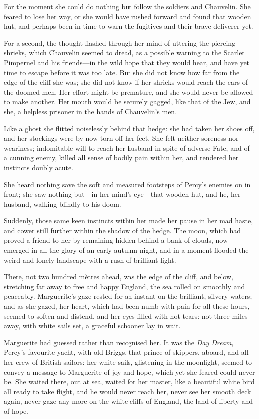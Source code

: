 \documentclass[paper=5.5in:8.5in,BCOR=7mm,twoside,DIV=calc,12pt,usegeometry,chapterprefix,endperiod,headings=big]{scrbook}
\begin{document}
For the moment she could do nothing but follow the soldiers and Chauvelin. She feared to lose her way, or she would have rushed forward and found that wooden hut, and perhaps been in time to warn the fugitives and their brave deliverer yet.

For a second, the thought flashed through her mind of uttering the piercing shrieks, which Chauvelin seemed to dread, as a possible warning to the Scarlet Pimpernel and his friends---in the wild hope that they would hear, and have yet time to escape before it was too late. But she did not know how far from the edge of the cliff she was; she did not know if her shrieks would reach the ears of the doomed men. Her effort might be premature, and she would never be allowed to make another. Her mouth would be securely gagged, like that of the Jew, and she, a helpless prisoner in the hands of Chauvelin's men.

Like a ghost she flitted noiselessly behind that hedge: she had taken her shoes off, and her stockings were by now torn off her feet. She felt neither soreness nor weariness; indomitable will to reach her husband in spite of adverse Fate, and of a cunning enemy, killed all sense of bodily pain within her, and rendered her instincts doubly acute.

She heard nothing save the soft and measured footsteps of Percy's enemies on in front; she saw nothing but---in her mind's eye---that wooden hut, and he, her husband, walking blindly to his doom.

Suddenly, those same keen instincts within her made her pause in her mad haste, and cower still further within the shadow of the hedge. The moon, which had proved a friend to her by remaining hidden behind a bank of clouds, now emerged in all the glory of an early autumn night, and in a moment flooded the weird and lonely landscape with a rush of brilliant light.

There, not two hundred mètres ahead, was the edge of the cliff, and below, stretching far away to free and happy England, the sea rolled on smoothly and peaceably. Marguerite's gaze rested for an instant on the brilliant, silvery waters; and as she gazed, her heart, which had been numb with pain for all these hours, seemed to soften and distend, and her eyes filled with hot tears: not three miles away, with white sails set, a graceful schooner lay in wait.

Marguerite had guessed rather than recognised her. It was the \textit{Day Dream}, Percy's favourite yacht, with old Briggs, that prince of skippers, aboard, and all her crew of British sailors: her white sails, glistening in the moonlight, seemed to convey a message to Marguerite of joy and hope, which yet she feared could never be. She waited there, out at sea, waited for her master, like a beautiful white bird all ready to take flight, and he would never reach her, never see her smooth deck again, never gaze any more on the white cliffs of England, the land of liberty and of hope.
\end{document}

